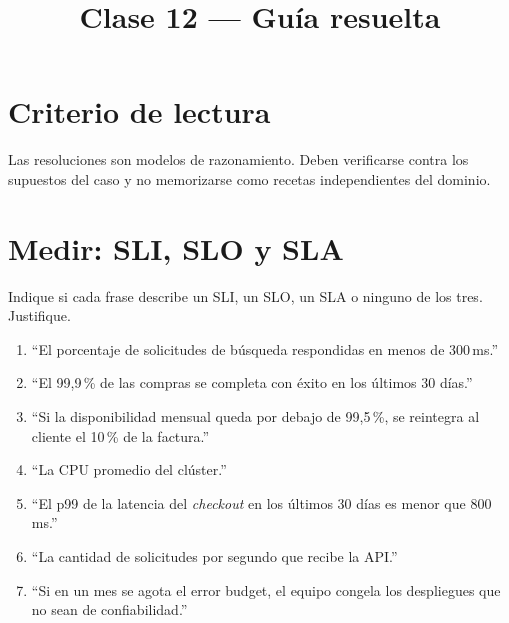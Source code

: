 \documentclass[variant=guia,cover=institutional,mode=screen]{ua-engineering-v6-article}
\title{Clase 12 --- Guía resuelta}
\author{\UAProfessor}
\date{\UADate}
\begin{document}
\section{Criterio de lectura}
Las resoluciones son modelos de razonamiento. Deben verificarse contra los supuestos del caso y no memorizarse como recetas independientes del dominio.

\section{Medir: SLI, SLO y SLA}
\begin{uaexercise}
Indique si cada frase describe un SLI, un SLO, un SLA o ninguno de los tres. Justifique.
\begin{enumerate}
\item ``El porcentaje de solicitudes de búsqueda respondidas en menos de 300\,ms.''
\item ``El 99,9\,\% de las compras se completa con éxito en los últimos 30 días.''
\item ``Si la disponibilidad mensual queda por debajo de 99,5\,\%, se reintegra al cliente el 10\,\% de la factura.''
\item ``La CPU promedio del clúster.''
\item ``El p99 de la latencia del \emph{checkout} en los últimos 30 días es menor que 800\,ms.''
\item ``La cantidad de solicitudes por segundo que recibe la API.''
\item ``Si en un mes se agota el error budget, el equipo congela los despliegues que no sean de confiabilidad.''
\end{enumerate}
\end{uaexercise}
\end{document}
